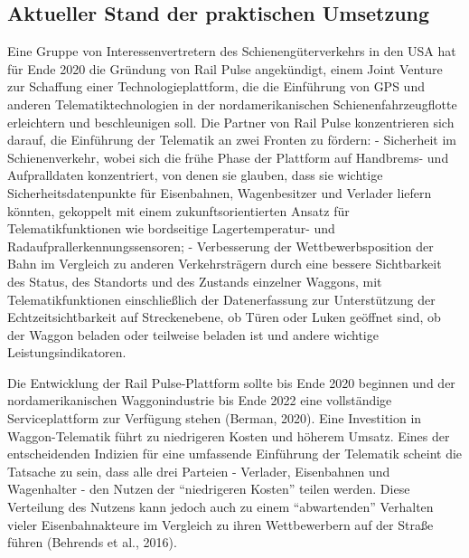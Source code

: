 \documentclass[
]{book}
\begin{document}
\hypertarget{aktueller-stand-der-praktischen-umsetzung-29}{%
\subsection*{Aktueller Stand der praktischen Umsetzung}\label{aktueller-stand-der-praktischen-umsetzung-29}}

Eine Gruppe von Interessenvertretern des Schienengüterverkehrs in den USA hat für Ende 2020 die Gründung von Rail Pulse angekündigt, einem Joint Venture zur Schaffung einer Technologieplattform, die die Einführung von GPS und anderen Telematiktechnologien in der nordamerikanischen Schienenfahrzeugflotte erleichtern und beschleunigen soll. Die Partner von Rail Pulse konzentrieren sich darauf, die Einführung der Telematik an zwei Fronten zu fördern:
- Sicherheit im Schienenverkehr, wobei sich die frühe Phase der Plattform auf Handbrems- und Aufpralldaten konzentriert, von denen sie glauben, dass sie wichtige Sicherheitsdatenpunkte für Eisenbahnen, Wagenbesitzer und Verlader liefern könnten, gekoppelt mit einem zukunftsorientierten Ansatz für Telematikfunktionen wie bordseitige Lagertemperatur- und Radaufprallerkennungssensoren;
- Verbesserung der Wettbewerbsposition der Bahn im Vergleich zu anderen Verkehrsträgern durch eine bessere Sichtbarkeit des Status, des Standorts und des Zustands einzelner Waggons, mit Telematikfunktionen einschließlich der Datenerfassung zur Unterstützung der Echtzeitsichtbarkeit auf Streckenebene, ob Türen oder Luken geöffnet sind, ob der Waggon beladen oder teilweise beladen ist und andere wichtige Leistungsindikatoren.

Die Entwicklung der Rail Pulse-Plattform sollte bis Ende 2020 beginnen und der nordamerikanischen Waggonindustrie bis Ende 2022 eine vollständige Serviceplattform zur Verfügung stehen (Berman, 2020). Eine Investition in Waggon-Telematik führt zu niedrigeren Kosten und höherem Umsatz. Eines der entscheidenden Indizien für eine umfassende Einführung der Telematik scheint die Tatsache zu sein, dass alle drei Parteien - Verlader, Eisenbahnen und Wagenhalter - den Nutzen der ``niedrigeren Kosten'' teilen werden. Diese Verteilung des Nutzens kann jedoch auch zu einem ``abwartenden'' Verhalten vieler Eisenbahnakteure im Vergleich zu ihren Wettbewerbern auf der Straße führen (Behrends et al., 2016).
\end{document}

